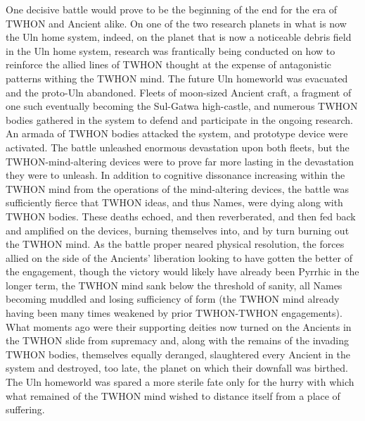 One decisive battle would prove to be the beginning of the end for the era of TWHON and Ancient alike. On one of the two research planets in what is now the Uln home system, indeed, on the planet that is now a noticeable debris field in the Uln home system, research was frantically being conducted on how to reinforce the allied lines of TWHON thought at the expense of antagonistic patterns withing the TWHON mind. The future Uln homeworld was evacuated and the proto-Uln abandoned. Fleets of moon-sized Ancient craft, a fragment of one such eventually becoming the Sul-Gatwa high-castle, and numerous TWHON bodies gathered in the system to defend and participate in the ongoing research. An armada of TWHON bodies attacked the system, and prototype device were activated. The battle unleashed enormous devastation upon both fleets, but the TWHON-mind-altering devices were to prove far more lasting in the devastation they were to unleash. In addition to cognitive dissonance increasing within the TWHON mind from the operations of the mind-altering devices, the battle was sufficiently fierce that TWHON ideas, and thus Names, were dying along with TWHON bodies. These deaths echoed, and then reverberated, and then fed back and amplified on the devices, burning themselves into, and by turn burning out the TWHON mind. As the battle proper neared physical resolution, the forces allied on the side of the Ancients' liberation looking to have gotten the better of the engagement, though the victory would likely have already been Pyrrhic in the longer term, the TWHON mind sank below the threshold of sanity, all Names becoming muddled and losing sufficiency of form (the TWHON mind already having been many times weakened by prior TWHON-TWHON engagements). What moments ago were their supporting deities now turned on the Ancients in the TWHON slide from supremacy and, along with the remains of the invading TWHON bodies, themselves equally deranged, slaughtered every Ancient in the system and destroyed, too late, the planet on which their downfall was birthed. The Uln homeworld was spared a more sterile fate only for the hurry with which what remained of the TWHON mind wished to distance itself from a place of suffering.

